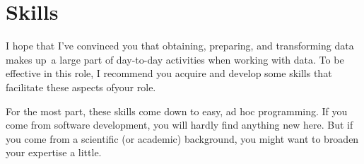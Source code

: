 \section{Skills}


I hope that I've convinced you that obtaining, preparing, and
transforming data makes up~a large part of day-to-day activities when
working with data. To be effective in this role, I recommend you
acquire and develop some skills that facilitate these aspects of\break your
role.

For the most part, these skills come down to easy, ad hoc programming.
If you come from  software development, you will hardly find anything
new here. But if you come from a scientific (or academic) background,
you might want to broaden your expertise a little.

